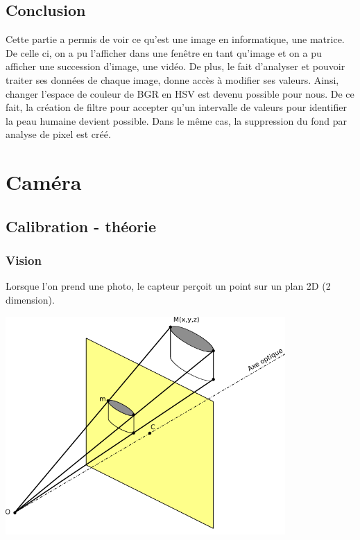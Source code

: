 \documentclass[12pt, french]{report}
\begin{document}
    \subsection{Conclusion}
    
    Cette partie a permis de voir ce qu'est une image en informatique, une matrice. De celle ci, on a pu l'afficher dans une fenêtre en tant qu'image et on a pu afficher une succession d'image, une vidéo. De plus, le fait d'analyser et pouvoir traiter ses données de chaque image, donne accès à modifier ses valeurs. Ainsi, changer l'espace de couleur de BGR en HSV est devenu possible pour nous. De ce fait, la création de filtre pour accepter qu'un intervalle de valeurs pour identifier la peau humaine devient possible. Dans le même cas, la suppression du fond par analyse de pixel est créé. 
    \newpage
\section{Caméra}
\subsection{Calibration - théorie}
\subsubsection{Vision}
Lorsque l'on prend une photo, le capteur perçoit un point sur un plan 2D (2 dimension).\\

\begin{center}
    \includegraphics[width=0.8\textwidth]{Images/Vision/Projection2D.png}
\end{center}
\end{document}
